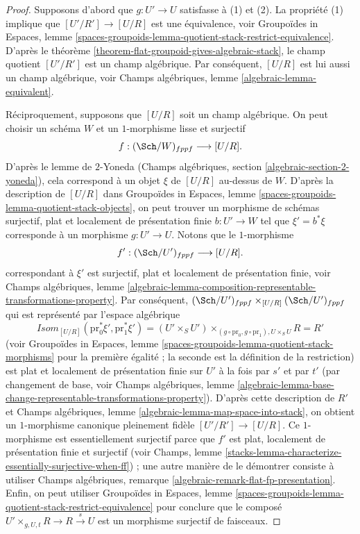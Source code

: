 \begin{proof}
Supposons d'abord que $g : U' \to U$ satisfasse à (1) et (2). La propriété (1)
implique que $[U'/R'] \to [U/R]$ est une équivalence, voir
Groupoïdes in Espaces,
lemme \ref{spaces-groupoids-lemma-quotient-stack-restrict-equivalence}.
D'après le
théorème \ref{theorem-flat-groupoid-gives-algebraic-stack},
le champ quotient $[U'/R']$ est un champ algébrique. Par conséquent,
$[U/R]$ est lui aussi un champ algébrique, voir
Champs algébriques, lemme \ref{algebraic-lemma-equivalent}.

\medskip\noindent
Réciproquement, supposons que $[U/R]$ soit un champ algébrique. On peut choisir un
schéma $W$ et un $1$-morphisme lisse et surjectif
$$
f : (\Sch/W)_{fppf} \longrightarrow [U/R].
$$
D'après le lemme de $2$-Yoneda
(Champs algébriques, section \ref{algebraic-section-2-yoneda}),
cela correspond à un objet $\xi$ de $[U/R]$ au-dessus de $W$.
D'après la description de $[U/R]$ dans
Groupoïdes in Espaces, lemme \ref{spaces-groupoids-lemma-quotient-stack-objects},
on peut trouver un morphisme de schémas surjectif, plat et localement de présentation finie
$b : U' \to W$ tel que $\xi' = b^*\xi$ corresponde à un morphisme
$g : U' \to U$. Notons que le $1$-morphisme
$$
f' : (\Sch/U')_{fppf} \longrightarrow [U/R].
$$
correspondant à $\xi'$ est surjectif, plat et localement de
présentation finie, voir
Champs algébriques, lemme
\ref{algebraic-lemma-composition-representable-transformations-property}.
Par conséquent,
$(\Sch/U')_{fppf} \times_{[U/R]} (\Sch/U')_{fppf}$
qui est représenté par l'espace algébrique
$$
\mathit{Isom}_{[U/R]}(\text{pr}_0^*\xi', \text{pr}_1^*\xi') =
(U' \times_S U')
\times_{(g \circ \text{pr}_0, g \circ \text{pr}_1), U \times_S U} R = R'
$$
(voir
Groupoïdes in Espaces, lemme
\ref{spaces-groupoids-lemma-quotient-stack-morphisms}
pour la première égalité ; la seconde est la définition de la restriction)
est plat et localement de présentation finie sur $U'$ à la fois par $s'$ et par $t'$
(par changement de base, voir
Champs algébriques, lemme
\ref{algebraic-lemma-base-change-representable-transformations-property}).
D'après cette description de $R'$ et
Champs algébriques, lemme \ref{algebraic-lemma-map-space-into-stack},
on obtient un $1$-morphisme canonique pleinement fidèle $[U'/R'] \to [U/R]$.
Ce $1$-morphisme est essentiellement surjectif parce que $f'$ est plat,
localement de présentation finie et surjectif (voir
Champs, lemme \ref{stacks-lemma-characterize-essentially-surjective-when-ff}) ;
une autre manière de le démontrer consiste à utiliser
Champs algébriques, remarque
\ref{algebraic-remark-flat-fp-presentation}.
Enfin, on peut utiliser
Groupoïdes in Espaces, lemme
\ref{spaces-groupoids-lemma-quotient-stack-restrict-equivalence}
pour conclure que le composé
$U' \times_{g, U, t} R \to R \xrightarrow{s} U$ est un morphisme surjectif de faisceaux.
\end{proof}

